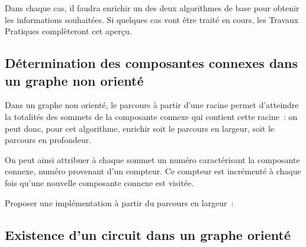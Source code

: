 \documentclass[11pt]{article}
\begin{document}
Dans chaque cas, il faudra enrichir un des deux algorithmes de base pour obtenir les informations souhaitées. Si quelques cas vont être traité en cours, les Travaux Pratiques complèteront cet aperçu. 

\subsection{Détermination des composantes connexes dans un graphe non orienté}

Dans un graphe non orienté, le parcours à partir d'une racine permet d'atteindre la totalités des sommets de la composante connexe qui contient cette racine~: on peut donc, pour cet algorithme, enrichir soit le parcours en largeur, soit le parcours en profondeur. 

On peut ainsi attribuer à chaque sommet un numéro caractérisant la composante connexe, numéro provenant d'un compteur. Ce compteur est incrémenté à chaque fois qu'une nouvelle composante connexe est visitée.

Proposer une implémentation à partir du parcours en largeur~: 

\UPSTIcorrection{

}

\newpage

%

\subsection{Existence d'un circuit dans un graphe orienté}
\end{document}
